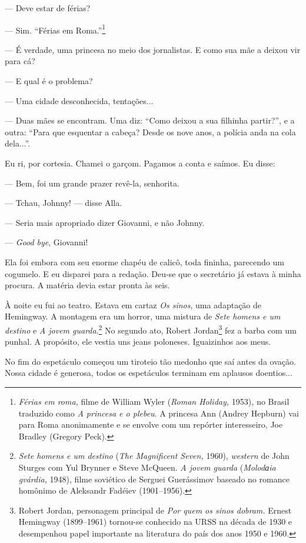 --- Deve estar de férias?

--- Sim. ``Férias em Roma.''\footnote{\emph{Férias em roma,} filme de
  William Wyler (\emph{Roman Holiday,} 1953)\emph{,} no Brasil traduzido
  como \emph{A princesa e o plebeu}. A princesa Ann (Andrey Hepburn) vai
  para Roma anonimamente e se envolve com um repórter interesseiro, Joe
  Bradley (Gregory Peck).}

--- É verdade, uma princesa no meio dos jornalistas. E como sua mãe a
deixou vir para cá?

--- E qual é o problema?

--- Uma cidade desconhecida, tentações...

--- Duas mães se encontram. Uma diz: ``Como deixou a sua filhinha
partir?'', e a outra: ``Para que esquentar a cabeça? Desde os nove anos,
a polícia anda na cola dela...''.

Eu ri, por cortesia. Chamei o garçom. Pagamos a conta e saímos. Eu
disse:

--- Bem, foi um grande prazer revê-la, senhorita.

--- Tchau, Johnny! --- disse Alla.

--- Seria mais apropriado dizer Giovanni, e não Johnny.

--- \emph{Good bye}, Giovanni!

Ela foi embora com seu enorme chapéu de calicô, toda fininha, parecendo
um cogumelo. E eu disparei para a redação. Deu-se que o secretário já
estava à minha procura. A matéria devia estar pronta às seis.

À noite eu fui ao teatro. Estava em cartaz \emph{Os sinos}, uma
adaptação de Hemingway. A montagem era um horror, uma mistura de
\emph{Sete homens e um destino} e \emph{A jovem guarda}.\footnote{\emph{Sete
  homens e um destino} (\emph{The Magnificent Seven,} 1960),
  \emph{western} de John Sturges com Yul Brynner e Steve McQueen.
  \emph{A jovem guarda} (\emph{Molodаia gvárdia,} 1948), filme soviético
  de Serguei Guerássimov baseado no romance homônimo de Aleksandr
  Fadéiev (1901--1956).} No segundo ato, Robert Jordan\footnote{Robert
  Jordan, personagem principal de \emph{Por quem os sinos dobram.}
  Ernest Hemingway (1899--1961) tornou-se conhecido na URSS na década de
  1930 e desempenhou papel importante na literatura do país dos anos
  1950 e 1960.} fez a barba com um punhal. A propósito, ele vestia uns
jeans poloneses. Iguaizinhos aos meus.

No fim do espetáculo começou um tiroteio tão medonho que saí antes da
ovação. Nossa cidade é generosa, todos os espetáculos terminam em
aplausos doentios...

